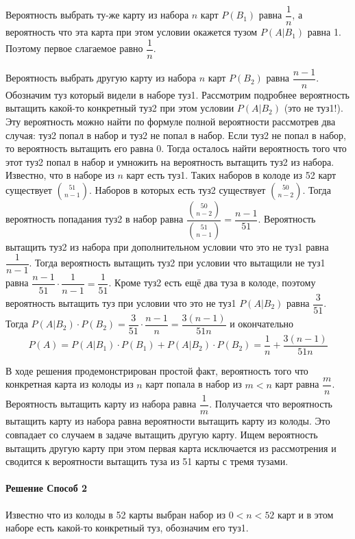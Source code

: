 \documentclass[a4paper,12pt]{article}
\begin{document}
Вероятность выбрать ту-же карту из набора \(n\) карт \(P(B_1)\) равна \( \dfrac{1}{n} \), а вероятность что эта карта при этом условии окажется тузом \(P(A|B_1)\) равна 1. Поэтому первое слагаемое равно \( \dfrac{1}{n} \).

Вероятность выбрать другую карту из набора \(n\) карт \(P(B_2)\) равна \( \dfrac{n-1}{n} \). Обозначим туз который видели в наборе туз1. Рассмотрим подробнее вероятность вытащить какой-то конкретный туз2 при этом условии \(P(A|B_2)\) (это не туз1!). Эту вероятность можно найти по формуле полной вероятности рассмотрев два случая: туз2 попал в набор и туз2 не попал в набор. Если туз2 не попал в набор, то вероятность вытащить его равна 0. Тогда осталось найти вероятность того что этот туз2 попал в набор и умножить на вероятность вытащить туз2 из набора. Известно, что в наборе из \(n\) карт есть туз1. Таких наборов в колоде из 52 карт существует \( \binom{51}{n-1} \). Наборов в которых есть туз2 существует \( \binom{50}{n-2} \). Тогда вероятность попадания туз2 в набор равна \( \dfrac{\binom{50}{n-2}}{\binom{51}{n-1}} = \dfrac{n-1}{51} \). Вероятность вытащить туз2 из набора при дополнительном условии что это не туз1 равна \(\dfrac{1}{n-1}\). Тогда вероятность вытащить туз2 при условии что вытащили не туз1 равна \( \dfrac{n-1}{51} \cdot \dfrac{1}{n-1} = \dfrac{1}{51} \). Кроме туз2 есть ещё два туза в колоде, поэтому вероятность вытащить туз при условии что это не туз1 \(P(A|B_2)\) равна \(\dfrac{3}{51} \). Тогда \( P(A|B_2) \cdot P(B_2) = \dfrac{3}{51} \cdot \dfrac{n-1}{n} = \dfrac{3(n-1)}{51n} \) и окончательно 
\[  P(A) = P(A|B_1) \cdot P(B_1) + P(A|B_2) \cdot P(B_2) = \dfrac{1}{n} + \dfrac{3(n-1)}{51n} \]

В ходе решения продемонстрирован простой факт, вероятность того что конкретная карта из колоды из \(n\) карт попала в набор из \(m < n\) карт равна \( \dfrac{m}{n} \). Вероятность вытащить карту из набора равна \( \dfrac{1}{m} \). Получается что вероятность вытащить карту из набора равна вероятности вытащить карту из колоды. Это совпадает со случаем в задаче вытащить другую карту. Ищем вероятность вытащить другую карту при этом первая карта исключается из рассмотрения и сводится к вероятности вытащить туза из 51 карты с тремя тузами.


\paragraph{Решение Способ 2}
Известно что из колоды в 52 карты выбран набор из \(0<n<52\) карт и в этом наборе есть какой-то конкретный туз, обозначим его туз1.
\end{document}
